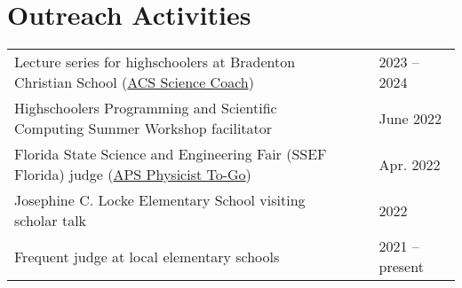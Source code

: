 \documentclass[letterpaper,11pt]{article}
\begin{document}
\section*{Outreach Activities}
\begin{tabular}{@{}p{}p{} l@{}}
     Lecture series for highschoolers at Bradenton Christian School (\href{https://www.acs.org/education/outreach/science-coaches.html}{ACS Science Coach})		& & 2023 -- 2024 \\[4pt]
     Highschoolers Programming and Scientific Computing Summer Workshop facilitator	 	& & June 2022 \\[4pt]
     Florida State Science and Engineering Fair (SSEF Florida) judge (\href{https://www.aps.org/programs/outreach/physiciststogo.cfm}{APS Physicist To-Go})	& & Apr. 2022 \\[4pt]
     Josephine C. Locke Elementary School visiting scholar talk              			& & 2022 \\[4pt]
     Frequent judge at local elementary schools                             			& & 2021 -- present \\[4pt]
\end{tabular}
\end{document}
